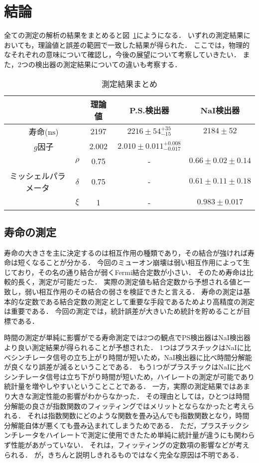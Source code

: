 \section{結論}
全ての測定の解析の結果をまとめると図~\ref{tab:result_conclusion}にようになる．
いずれの測定結果においても，理論値と誤差の範囲で一致した結果が得られた．
ここでは，物理的なそれぞれの意味について確認し，今後の展望について考察していきたい．
また，2つの検出器の測定結果についての違いも考察する．

\begin{table}
  \centering
  \caption{測定結果まとめ}
  \label{tab:result_conclusion}
  \begin{tabular}{ccccc}\toprule
    & & 理論値 & P.S.検出器 & NaI検出器\\ \midrule
    \multicolumn{2}{c}{寿命($\mathrm{ns}$)} &  2197 & $2216 \pm 54^{ + 35}_{ - 15}$ & $2184\pm52$ \\
    \multicolumn{2}{c}{$g$因子}               & 2.002 & $2.010 \pm 0.011^{+0.008}_{-0.017}$ &  \\ %
                         & $\rho$           &  0.75 & - & $0.66\pm0.02\pm0.14$ \\
    ミッシェルパラメータ & $\delta$         &  0.75 & - & $0.61\pm0.11\pm0.18$ \\
                         & $\xi$            &  1    & - & $0.983\pm0.017$\\ \bottomrule
  \end{tabular}
\end{table}

\subsection{寿命の測定}
寿命の大きさを主に決定するのは相互作用の種類であり，その結合が強ければ寿命は短くなることが分かる．
今回のミューオン崩壊は弱い相互作用によって生じており，その名の通り結合が弱くFermi結合定数が小さい．
そのため寿命は比較的長く，測定が可能だった．
実際の測定値も結合定数から予想される値と一致し，弱い相互作用のその結合の弱さを検証できたと言える．
寿命の測定は基本的な定数である結合定数の測定として重要な手段であるためより高精度の測定は重要である．
今回の測定では，統計誤差が大きいため統計を貯めることが目標である．

時間の測定が単純に影響がでる寿命測定では2つの観点でPS検出器はNaI検出器より良い測定結果が得られることが予想された．
1つはプラスチックはNaIに比べシンチレータ信号の立ち上がり時間が短いため，NaI検出器に比べ時間分解能が良くなり誤差が減るということである．
もう1つがプラスチックはNaIに比べシンチレータ信号は立ち下がり時間が短いため，ハイレートの測定が可能であり統計量を増やしやすいということことである．
一方，実際の測定結果ではあまり大きな測定性能の影響がわからなかった．
その理由としては，ひとつは時間分解能の良さが指数関数のフィッティングではメリットとならなかったと考えられる．
それは指数関数にどのような関数を畳み込んでも指数関数となり，時間分解能自体が悪くても畳み込まれてしまうためである．
ただ，プラスチックシンチレータをハイレートで測定に使用できたため単純に統計量が違うにも関わらず性能があがっていない．
それは，フィッティングの定数項の影響などが考えられる．
が，きちんと説明しきれるものではなく完全な原因は不明である．

